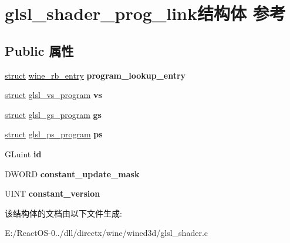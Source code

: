 \hypertarget{structglsl__shader__prog__link}{}\section{glsl\+\_\+shader\+\_\+prog\+\_\+link结构体 参考}
\label{structglsl__shader__prog__link}
\subsection*{Public 属性}
\begin{DoxyCompactItemize}
\item 
\mbox{\label{structglsl__shader__prog__link_a39c265422d2ff944d000495a17ab58e7}} 
\hyperlink{interfacestruct}{struct} \hyperlink{structwine__rb__entry}{wine\+\_\+rb\+\_\+entry} {\bfseries program\+\_\+lookup\+\_\+entry}
\item 
\mbox{\label{structglsl__shader__prog__link_a1d350e35e52ca97b2d15dec6fdb7dbb2}} 
\hyperlink{interfacestruct}{struct} \hyperlink{structglsl__vs__program}{glsl\+\_\+vs\+\_\+program} {\bfseries vs}
\item 
\mbox{\label{structglsl__shader__prog__link_a41cd755f8bf55c02d8eaea3fb558d632}} 
\hyperlink{interfacestruct}{struct} \hyperlink{structglsl__gs__program}{glsl\+\_\+gs\+\_\+program} {\bfseries gs}
\item 
\mbox{\label{structglsl__shader__prog__link_af6708ae9935f707a45228ac709f24827}} 
\hyperlink{interfacestruct}{struct} \hyperlink{structglsl__ps__program}{glsl\+\_\+ps\+\_\+program} {\bfseries ps}
\item 
\mbox{\label{structglsl__shader__prog__link_a16389a889584634bc7182d29c8b7b420}} 
G\+Luint {\bfseries id}
\item 
\mbox{\label{structglsl__shader__prog__link_a5f82a574e931a1d407b24751f9c50b79}} 
D\+W\+O\+RD {\bfseries constant\+\_\+update\+\_\+mask}
\item 
\mbox{\label{structglsl__shader__prog__link_aabddd5687c6533f1d5cd09197b1812de}} 
U\+I\+NT {\bfseries constant\+\_\+version}
\end{DoxyCompactItemize}


该结构体的文档由以下文件生成\+:\begin{DoxyCompactItemize}
\item 
E\+:/\+React\+O\+S-\/0../dll/directx/wine/wined3d/glsl\+\_\+shader.\+c\end{DoxyCompactItemize}
